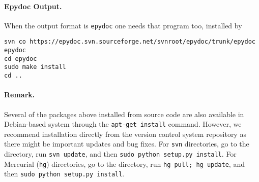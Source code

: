 \documentclass[%
oneside,                 %
final,                   %
10pt]{article}
\begin{document}
\paragraph{Epydoc Output.}
When the output format is {\fontsize{10pt}{10pt}\Verb!epydoc!} one needs that program too, installed
by
\vspace{4pt}
\begin{Verbatim}[numbers=none,frame=lines,label=\fbox{{\tiny Terminal}},fontsize=\fontsize{9pt}{9pt},
labelposition=topline,framesep=2.5mm,framerule=0.7pt]
svn co https://epydoc.svn.sourceforge.net/svnroot/epydoc/trunk/epydoc epydoc
cd epydoc
sudo make install
cd ..
\end{Verbatim}

\paragraph{Remark.}
Several of the packages above installed from source code
are also available in Debian-based system through the
{\fontsize{10pt}{10pt}\Verb!apt-get install!} command. However, we recommend installation directly
from the version control system repository as there might be important
updates and bug fixes. For {\fontsize{10pt}{10pt}\Verb!svn!} directories, go to the directory,
run {\fontsize{10pt}{10pt}\Verb!svn update!}, and then {\fontsize{10pt}{10pt}\Verb!sudo python setup.py install!}. For
Mercurial ({\fontsize{10pt}{10pt}\Verb!hg!}) directories, go to the directory, run
{\fontsize{10pt}{10pt}\Verb!hg pull; hg update!}, and then {\fontsize{10pt}{10pt}\Verb!sudo python setup.py install!}.

\printindex
\end{document}
